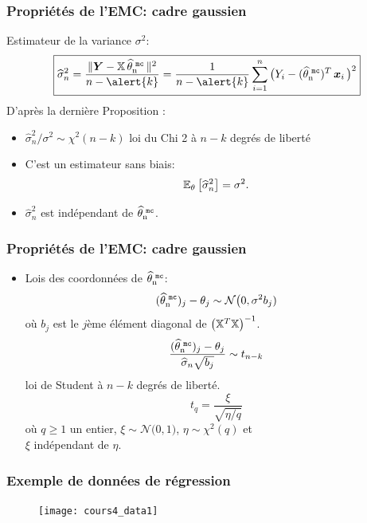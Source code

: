 \begin{frame}
\frametitle{Propriétés de l'EMC: cadre gaussien}

Estimateur de la variance $\sigma^2$:
$$\boxed{\widehat \sigma_n^2 = \frac{\|\boldsymbol{Y}-\regressmat \estMC\|^2}{n-\alert{k}} = \frac{1}{n-\alert{k}}\sum_{i = 1}^n\big(Y_i-(\estMC)^T\bx_i\big)^2}$$
D'après la dernière Proposition :
\begin{itemize}
\item $\widehat
\sigma_n^2/\sigma^2 \sim \chi^2(n-k)$ \alert{ loi du Chi 2 à
$n-k$ degrés de liberté}
\item C'est un estimateur \alert{sans biais}: $$\operatorname{{\mathbb E}}_\theta\big[\widehat
\sigma_n^2\big]=\sigma^2.$$
\item $\widehat
\sigma_n^2$ est \alert{indépendant} de $\operatorname{\widehat \theta_n^{\,\,{\tt mc}}}$.
\end{itemize}
\end{frame}

\begin{frame}
\frametitle{Propriétés de l'EMC: cadre gaussien}
\begin{itemize}
\item Lois des coordonnées de $\operatorname{\widehat \theta_n^{\,\,{\tt mc}}}$:
$$
(\operatorname{\widehat \theta_n^{\,\,{\tt mc}}})_j -\theta_j \sim {\mathcal N}\big(0, \sigma^2 b_j)
$$
o\`u $b_j$ est le $j$ème élément diagonal de $\big(\mathbb{X}^T
\mathbb{X}\big)^{-1}$. $$ \frac{(\operatorname{\widehat \theta_n^{\,\,{\tt mc}}})_j -\theta_j}{\widehat
\sigma_n \sqrt{b_j}} \sim t_{n-k}$$ \alert{loi de Student \`a
$n-k$ degrés de liberté}.
$$ t_q = \frac{\xi}{\sqrt{\eta/q}}$$
o\`u $q\ge 1$ un entier, $\xi\sim {\mathcal N}\big(0,1)$, $\eta\sim
\chi^2(q)$ et\\ $\xi$ \alert{indépendant} de $\eta$.
\end{itemize}
\end{frame}

\begin{frame}
    \frametitle{Exemple de données de régression}
\begin{figure}
\texttt{[image: cours4\_data1]}
\end{figure}
\end{frame}

